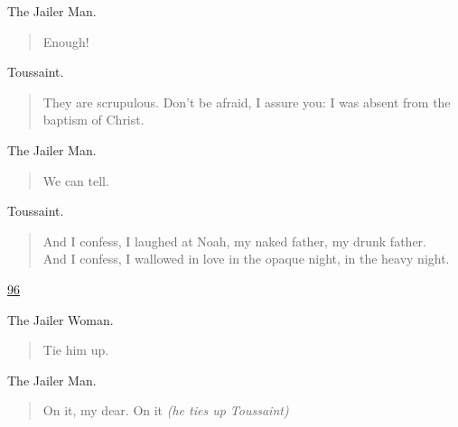 \documentclass[letterpaper,article,12pt,oneside,notitlepage]{memoir}
\begin{document}
\begin{center}The Jailer Man.\end{center}

\begin{verse}
Enough! \\
\end{verse}

\begin{center}Toussaint.\end{center}

\begin{verse}
They are scrupulous. Don't be afraid, I assure you: I was absent from the baptism of Christ.  \\
\end{verse}

\begin{center}The Jailer Man.\end{center}

\begin{verse}
We can tell. \\
\end{verse}

\begin{center}Toussaint.\end{center}

\begin{verse}
And I confess, I laughed at Noah, my naked father, my drunk father. \\
And I confess, I wallowed in love in the opaque night, in the heavy night. \\
\end{verse}

\clearpage

\href{http://cesaire.elotroalex.com/chiens/chiens/p096.html}{96}

\begin{center}The Jailer Woman.\end{center}

\begin{verse}
Tie him up. \\
\end{verse}

\begin{center}The Jailer Man.\end{center}

\begin{verse}
On it, my dear. On it \textit{(he ties up Toussaint)} \\
\end{verse}
\end{document}
